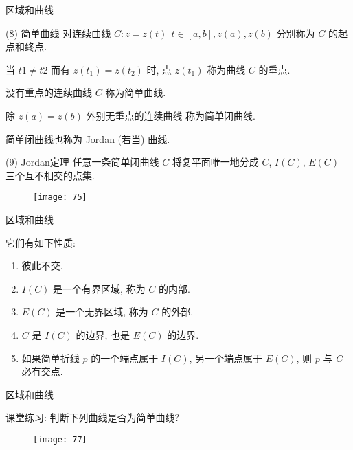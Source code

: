 \documentclass{beamer}
\begin{document}
\begin{frame}{区域和曲线}
\begin{alertblock}{(8) 简单曲线}
对连续曲线 $ C: z=z(t)~~ t\in [a, b], z(a), z(b) $ 分别称为 $ C $ 的起点和终点. 

当 $ t1\neq t2 $ 而有 $ z(t_1)=z(t_2) $ 时, 点 $ z(t_1) $ 称为曲线 $ C $ 的重点. 

没有重点的连续曲线 $ C $ 称为简单曲线.

除 $ z(a)= z(b) $ 外别无重点的连续曲线 称为简单闭曲线.

简单闭曲线也称为 Jordan (若当) 曲线.

\end{alertblock}

\begin{theorem}{(9) Jordan定理}
任意一条简单闭曲线 $ C $ 将复平面唯一地分成 $ C $,  $ I(C) $,  $ E(C) $ 三个互不相交的点集. 
\begin{figure}\vspace{-5mm}
\texttt{[image: 75]}
\end{figure}
\end{theorem}
\end{frame}

\begin{frame}{区域和曲线}
\begin{block}{它们有如下性质: }
\begin{enumerate}
	\item 彼此不交. 
	\item $ I(C) $ 是一个有界区域, 称为 $ C $ 的内部. 
	\item  $ E(C) $ 是一个无界区域, 称为 $ C $ 的外部. 
	\item $ C $ 是 $ I(C) $ 的边界, 也是 $ E(C) $ 的边界. 
	\item 如果简单折线 $ p $ 的一个端点属于 $ I(C) $, 另一个端点属于 $ E(C) $, 则 $ p $ 与 $ C $ 必有交点.
\end{enumerate}

\end{block}
\end{frame}

\begin{frame}{区域和曲线}
\begin{block}{课堂练习: 判断下列曲线是否为简单曲线?}
\begin{figure}
\texttt{[image: 77]}
\end{figure}
\end{block}
\end{frame}
\end{document}
